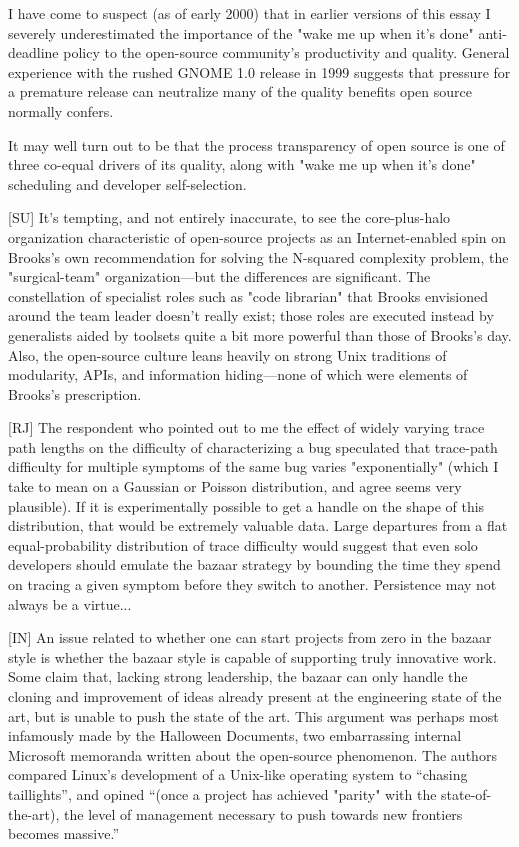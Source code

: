 \documentclass[a4paper,12pt,UTF8,twoside]{ctexbook}
\begin{document}
I have come to suspect (as of early 2000) that in earlier versions of this essay I severely underestimated the importance of the "wake me up when it's done" anti-deadline policy to the open-source community's productivity and quality. General experience with the rushed GNOME 1.0 release in 1999 suggests that pressure for a premature release can neutralize many of the quality benefits open source normally confers.

It may well turn out to be that the process transparency of open source is one of three co-equal drivers of its quality, along with "wake me up when it's done" scheduling and developer self-selection.

[SU] It's tempting, and not entirely inaccurate, to see the core-plus-halo organization characteristic of open-source projects as an Internet-enabled spin on Brooks's own recommendation for solving the N-squared complexity problem, the "surgical-team" organization—but the differences are significant. The constellation of specialist roles such as "code librarian" that Brooks envisioned around the team leader doesn't really exist; those roles are executed instead by generalists aided by toolsets quite a bit more powerful than those of Brooks's day. Also, the open-source culture leans heavily on strong Unix traditions of modularity, APIs, and information hiding—none of which were elements of Brooks's prescription.

[RJ] The respondent who pointed out to me the effect of widely varying trace path lengths on the difficulty of characterizing a bug speculated that trace-path difficulty for multiple symptoms of the same bug varies "exponentially" (which I take to mean on a Gaussian or Poisson distribution, and agree seems very plausible). If it is experimentally possible to get a handle on the shape of this distribution, that would be extremely valuable data. Large departures from a flat equal-probability distribution of trace difficulty would suggest that even solo developers should emulate the bazaar strategy by bounding the time they spend on tracing a given symptom before they switch to another. Persistence may not always be a virtue...

[IN] An issue related to whether one can start projects from zero in the bazaar style is whether the bazaar style is capable of supporting truly innovative work. Some claim that, lacking strong leadership, the bazaar can only handle the cloning and improvement of ideas already present at the engineering state of the art, but is unable to push the state of the art. This argument was perhaps most infamously made by the Halloween Documents, two embarrassing internal Microsoft memoranda written about the open-source phenomenon. The authors compared Linux's development of a Unix-like operating system to ``chasing taillights'', and opined ``(once a project has achieved "parity" with the state-of-the-art), the level of management necessary to push towards new frontiers becomes massive.''
\end{document}
